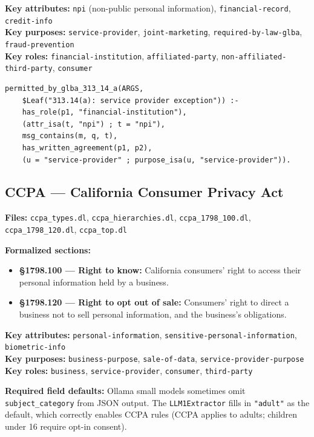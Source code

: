 \documentclass[11pt,letterpaper]{article}
\begin{document}
\begin{appendices}
\textbf{Key attributes:} \texttt{npi} (non-public personal information), \texttt{financial-record}, \texttt{credit-info}\\
\textbf{Key purposes:} \texttt{service-provider}, \texttt{joint-marketing}, \texttt{required-by-law-glba}, \texttt{fraud-prevention}\\
\textbf{Key roles:} \texttt{financial-institution}, \texttt{affiliated-party}, \texttt{non-affiliated-third-party}, \texttt{consumer}

\begin{lstlisting}[style=soufflestyle,caption={GLBA \S 313.14(a) exception for service providers}]
permitted_by_glba_313_14_a(ARGS,
    $Leaf("313.14(a): service provider exception")) :-
    has_role(p1, "financial-institution"),
    (attr_isa(t, "npi") ; t = "npi"),
    msg_contains(m, q, t),
    has_written_agreement(p1, p2),
    (u = "service-provider" ; purpose_isa(u, "service-provider")).
\end{lstlisting}

\subsection{CCPA --- California Consumer Privacy Act}

\textbf{Files:} \texttt{ccpa\_types.dl}, \texttt{ccpa\_hierarchies.dl}, \texttt{ccpa\_1798\_100.dl}, \texttt{ccpa\_1798\_120.dl}, \texttt{ccpa\_top.dl}

\textbf{Formalized sections:}
\begin{itemize}
  \item \textbf{\S 1798.100 --- Right to know:} California consumers' right to access their personal information held by a business.
  \item \textbf{\S 1798.120 --- Right to opt out of sale:} Consumers' right to direct a business not to sell personal information, and the business's obligations.
\end{itemize}

\textbf{Key attributes:} \texttt{personal-information}, \texttt{sensitive-personal-information}, \texttt{biometric-info}\\
\textbf{Key purposes:} \texttt{business-purpose}, \texttt{sale-of-data}, \texttt{service-provider-purpose}\\
\textbf{Key roles:} \texttt{business}, \texttt{service-provider}, \texttt{consumer}, \texttt{third-party}

\textbf{Required field defaults:} Ollama small models sometimes omit \texttt{subject\_category} from JSON output. The \texttt{LLM1Extractor} fills in \texttt{"adult"} as the default, which correctly enables CCPA rules (CCPA applies to adults; children under 16 require opt-in consent).


\end{appendices}
\end{document}
